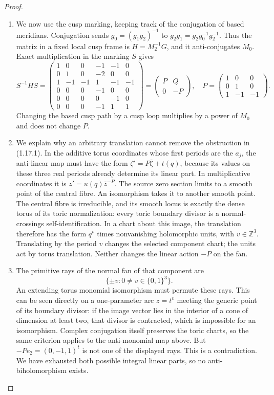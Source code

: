 \begin{proof}
\begin{enumerate}[label={$\langle1\rangle$\arabic*.}]
\item We now use the cusp marking, keeping track of the conjugation of based meridians.  Conjugation sends
$g_0=(g_1g_2)^{-1}$ to $g_2g_1=g_2g_0^{-1}g_2^{-1}$.
Thus the matrix in a fixed local cusp frame is
$H=M_2^{-1}G$, and it anti-conjugates $M_0$.
Exact multiplication in the marking $S$ gives
\[
S^{-1}HS=
\begin{pmatrix}
1&0&0&-1&-1&0\\
0&1&0&-2&0&0\\
1&-1&-1&1&-1&-1\\
0&0&0&-1&0&0\\
0&0&0&0&-1&0\\
0&0&0&-1&1&1
\end{pmatrix}
=\begin{pmatrix}P&Q\\0&-P\end{pmatrix},\quad
P=\begin{pmatrix}1&0&0\\0&1&0\\1&-1&-1\end{pmatrix}.
\tag{1.17.1}
\]
Changing the based cusp path by a cusp loop multiplies by a power of
$M_0$ and does not change $P$.

\item We explain why an arbitrary translation cannot remove the obstruction
in (1.17.1).  In the additive torus coordinates whose first periods
are the $a_j$, the anti-linear map must have the form
$\zeta' =P\bar\zeta+t(q)$, because its values on these three real
periods already determine its linear part.  In multiplicative
coordinates it is
$z'=u(q)\bar z^{-P}$.
The source zero section limits to a smooth point of the central fibre.
An isomorphism takes it to another smooth point.  The central fibre
is irreducible, and its smooth locus is exactly the dense torus of
its toric normalization: every toric boundary divisor is a
normal-crossings self-identification.  In a chart about this image,
the translation therefore has the form $q^v$ times nonvanishing
holomorphic units, with $v\in\mathbb Z^3$.  Translating by the period
$v$ changes the selected component chart; the units act by torus
translation.  Neither changes the linear action $-P$ on the fan.

\item The primitive rays of the normal fan of that component are
\[
\{\pm v:0\ne v\in\{0,1\}^3\}.
\]
An extending torus monomial isomorphism must permute these rays.
This can be seen directly on a one-parameter arc $z=t^v$ meeting the
generic point of its boundary divisor: if the image vector lies in
the interior of a cone of dimension at least two, that divisor is
contracted, which is impossible for an isomorphism.  Complex
conjugation itself preserves the toric charts, so the same criterion
applies to the anti-monomial map above.
But $-Pe_2=(0,-1,1)^t$ is not one of the displayed rays.
This is a contradiction.  We have exhausted both possible integral
linear parts, so no anti-biholomorphism exists.


\end{enumerate}
\end{proof}


